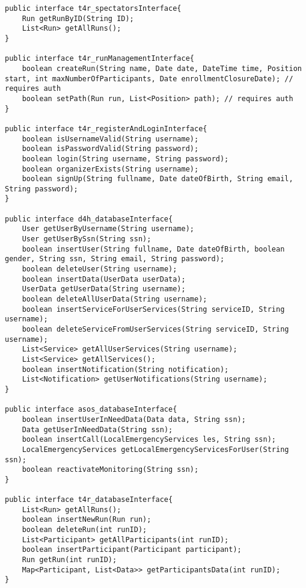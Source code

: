 \documentclass[../../DD.tex]{subfiles}
\begin{document}
\begin{lstlisting}
public interface t4r_spectatorsInterface{
	Run getRunByID(String ID);
	List<Run> getAllRuns();
}

public interface t4r_runManagementInterface{
	boolean createRun(String name, Date date, DateTime time, Position start, int maxNumberOfParticipants, Date enrollmentClosureDate); // requires auth
	boolean setPath(Run run, List<Position> path); // requires auth
}

public interface t4r_registerAndLoginInterface{
	boolean isUsernameValid(String username);
	boolean isPasswordValid(String password);
	boolean login(String username, String password);
	boolean organizerExists(String username);
	boolean signUp(String fullname, Date dateOfBirth, String email, String password);
}

public interface d4h_databaseInterface{
	User getUserByUsername(String username);
	User getUserBySsn(String ssn);
	boolean insertUser(String fullname, Date dateOfBirth, boolean gender, String ssn, String email, String password);
	boolean deleteUser(String username);
	boolean insertData(UserData userData);
	UserData getUserData(String username);
	boolean deleteAllUserData(String username);
	boolean insertServiceForUserServices(String serviceID, String username);
	boolean deleteServiceFromUserServices(String serviceID, String username);
	List<Service> getAllUserServices(String username);
	List<Service> getAllServices();
	boolean insertNotification(String notification);
	List<Notification> getUserNotifications(String username);
}

public interface asos_databaseInterface{
	boolean insertUserInNeedData(Data data, String ssn);
	Data getUserInNeedData(String ssn);
	boolean insertCall(LocalEmergencyServices les, String ssn);
	LocalEmergencyServices getLocalEmergencyServicesForUser(String ssn);
	boolean reactivateMonitoring(String ssn);
}

public interface t4r_databaseInterface{
	List<Run> getAllRuns();
	boolean insertNewRun(Run run);
	boolean deleteRun(int runID);
	List<Participant> getAllParticipants(int runID);
	boolean insertParticipant(Participant participant);
	Run getRun(int runID);
	Map<Participant, List<Data>> getParticipantsData(int runID);
}

\end{lstlisting}
\end{document}
